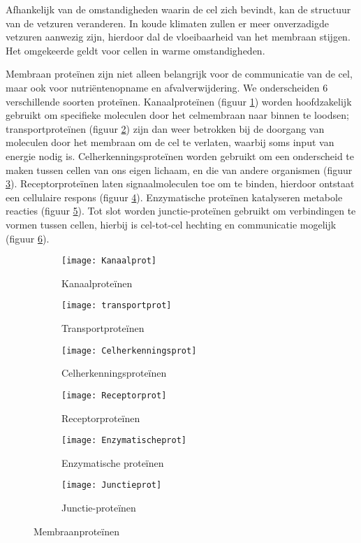 \documentclass[a4paper,kul]{kulakarticle} %
\begin{document}
Afhankelijk van de omstandigheden waarin de cel zich bevindt, kan de structuur van de vetzuren veranderen. In koude klimaten zullen er meer onverzadigde vetzuren aanwezig zijn, hierdoor dal de vloeibaarheid van het membraan stijgen. Het omgekeerde geldt voor cellen in warme omstandigheden. 

Membraan proteïnen zijn niet alleen belangrijk voor de communicatie van de cel, maar ook voor nutriëntenopname en afvalverwijdering. We onderscheiden 6 verschillende soorten proteïnen. Kanaalproteïnen (figuur \ref{fig:kanaal}) worden hoofdzakelijk gebruikt om specifieke moleculen door het celmembraan naar binnen te loodsen; transportproteïnen (figuur \ref{fig:transport}) zijn dan weer betrokken bij de doorgang van moleculen door het membraan om de cel te verlaten, waarbij soms input van energie nodig is. Celherkenningsproteïnen worden gebruikt om een onderscheid te maken tussen cellen van ons eigen lichaam, en die van andere organismen (figuur \ref{fig:Celherkenningsproteïnen}). Receptorproteïnen laten signaalmoleculen toe om te binden, hierdoor ontstaat een cellulaire respons (figuur \ref{fig:Receptorproteïnen}). Enzymatische proteïnen katalyseren metabole reacties (figuur \ref{fig:Enzymproteïnen}). Tot slot worden junctie-proteïnen gebruikt om verbindingen te vormen tussen cellen, hierbij is cel-tot-cel hechting en communicatie mogelijk (figuur \ref{fig:Junctieproteïnen}).
\begin{figure}[!htbp]
	\centering
	\begin{subfigure}{.5\textwidth}
		\centering
		\texttt{[image: Kanaalprot]}
		\caption{Kanaalproteïnen}
		\label{fig:kanaal}
	\end{subfigure}%
	\begin{subfigure}{.5\textwidth}
		\centering
		\texttt{[image: transportprot]}
		\caption{Transportproteïnen}
		\label{fig:transport}
	\end{subfigure}
\medskip
	\begin{subfigure}{.5\textwidth}
		\centering
		\texttt{[image: Celherkenningsprot]}
		\caption{Celherkenningsproteïnen}
		\label{fig:Celherkenningsproteïnen}
	\end{subfigure}%
	\begin{subfigure}{.5\textwidth}
		\centering
		\texttt{[image: Receptorprot]}
		\caption{Receptorproteïnen}
		\label{fig:Receptorproteïnen}
	\end{subfigure}
\medskip
	\begin{subfigure}{.5\textwidth}
		\centering
		\texttt{[image: Enzymatischeprot]}
		\caption{Enzymatische proteïnen}
		\label{fig:Enzymproteïnen}
	\end{subfigure}%
	\begin{subfigure}{.5\textwidth}
		\centering
		\texttt{[image: Junctieprot]}
		\caption{Junctie-proteïnen}
		\label{fig:Junctieproteïnen}
	\end{subfigure}
	\caption{Membraanproteïnen}
	\label{fig:membraanprot}
\end{figure}\\
\newpage
\end{document}
